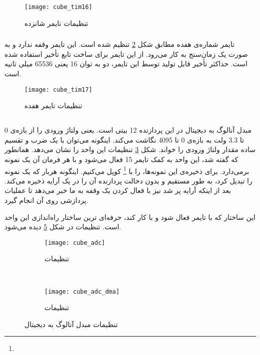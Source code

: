 	\begin{figure}[h]
		\centering
		\texttt{[image: cube\_tim16]}
		\caption{تنظیمات تایمر شانزده}
		\label{fig:cube-tim16}
	\end{figure}

\subsubsection{}
تایمر شماره‌ی هفده مطابق شکل \ref{fig:cube-tim17} تنظیم شده است. این تایمر وقفه ندارد و به صورت یک زمان‌سنج به کار می‌رود. از این تایمر برای ساخت تابع تأخیر استفاده شده است. حداکثر تأخیر قابل تولید توسط این تایمر، دو به توان 16 یعنی 65536 میلی ‌ثانیه است. 

	\begin{figure}[h]
		\centering
		\texttt{[image: cube\_tim17]}
		\caption{تنظیمات تایمر هفده}
		\label{fig:cube-tim17}
	\end{figure}

\subsection{}
مبدل آنالوگ به دیجیتال در این پردازنده 12 بیتی است. یعنی ولتاژ ورودی را از بازه‌ی 0 تا 3.3 ولت به بازه‌ی 0 تا 4095 نگاشت می‌کند. اینگونه می‌توان با یک ضرب و تقسیم ساده مقدار ولتاژ ورودی را خواند. شکل \ref{fig:cube-adc} تنظیمات این واحد را نشان می‌دهد. همانطور که گفته شد، این واحد به کمک تایمر 15 فعال می‌شود و با هر فرمان آن یک نمونه برمی‌دارد. برای ذخیره‌ی این نمونه‌ها،  را با
\footnote{}
کوپل می‌کنیم. اینگونه هربار که  یک نمونه را تبدیل کرد، به طور مستقیم و بدون دخالت پردازنده آن را در یک آرایه ذخیره می‌کند. بعد از اینکه آرایه پر شد نیز با فعال کردن یک وقفه به ما خبر می‌دهد تا عملیات پردازشی روی آن انجام گیرد.

این ساختار که  با تایمر فعال شود و با  کار کند، حرفه‌ای ترین ساختار راه‌اندازی این واحد است. تنظیمات  در شکل \ref{fig:cube-adc-dma} دیده می‌شود.

	\begin{figure}[h]
		\centering
		\begin{subfigure}{0.5\textwidth}
			\centering
			\texttt{[image: cube\_adc]}
			\caption{تنظیمات }
			\label{fig:cube-adc}
		\end{subfigure} \\
		\begin{subfigure}{0.54\textwidth}
			\centering
			\texttt{[image: cube\_adc\_dma]}
			\caption{تنظیمات }
			\label{fig:cube-adc-dma}
		\end{subfigure}
		\caption{تنظیمات مبدل آنالوگ به دیجیتال}
	\end{figure}


